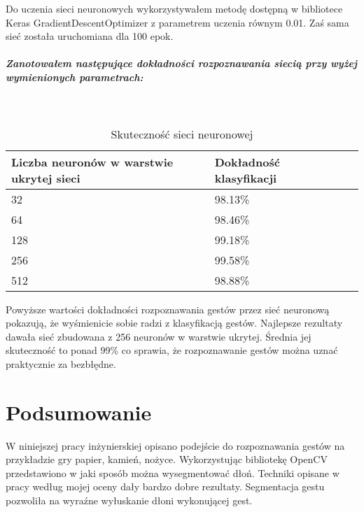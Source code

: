 \documentclass[a4paper,12pt,twoside,openany]{report}
\begin{document}
	Do uczenia sieci neuronowych wykorzystywałem metodę dostępną w bibliotece Keras GradientDescentOptimizer z parametrem uczenia równym 0.01. Zaś sama sieć została uruchomiana dla 100 epok. 
	
	\paragraph{Zanotowałem następujące dokładności rozpoznawania siecią przy wyżej wymienionych parametrach:}
	
	\mbox{}\\
	
	\begin{table}[H]
		\centering
		\begin{tabularx}{\textwidth}{|X|X|X|X|}
			\hline
			\textbf{Liczba neuronów w warstwie ukrytej sieci} & \textbf{Dokładność klasyfikacji} \\ 
			
			\hline
			32  & 98.13\% \\ 
			
			\hline
			64  & 98.46\% \\
			
			\hline
			128  & 99.18\% \\
			
			\hline
			256  & 99.58\% \\
			
			\hline
			512  & 98.88\% \\
			
			\hline
		\end{tabularx}
		
		\caption{Skuteczność sieci neuronowej}
	\end{table}

	Powyższe wartości dokładności rozpoznawania gestów przez sieć neuronową pokazują, że wyśmienicie sobie radzi z klasyfikacją gestów. Najlepsze rezultaty dawała sieć zbudowana z 256 neuronów w warstwie ukrytej. Średnia jej skuteczność to ponad 99\% co sprawia, że rozpoznawanie gestów można uznać praktycznie za bezbłędne. 	

\chapter{Podsumowanie}
	W niniejszej pracy inżynierskiej opisano podejście do rozpoznawania gestów na przykładzie gry papier, kamień, nożyce. Wykorzystując bibliotekę OpenCV przedstawiono w jaki sposób można wysegmentować dłoń. Techniki opisane w pracy według mojej oceny dały bardzo dobre rezultaty. Segmentacja gestu pozwoliła na wyraźne wyłuskanie dłoni wykonującej gest.
	
\end{document}
